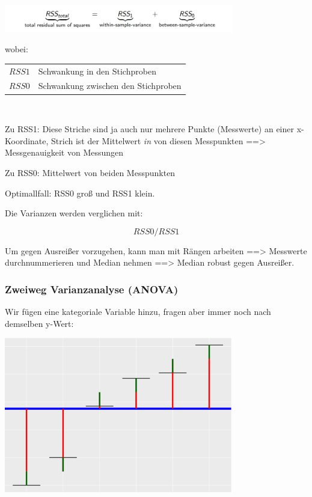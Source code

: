 \documentclass[
]{article}
\begin{document}
\includegraphics[width=10cm, center]{Fig9}

\bgroup wobei: \begin{tabular}[t]{>{$}l<{$} @{${} \quad ... \quad {}$} l}
RSS1 & Schwankung in den Stichproben \\
RSS0 & Schwankung zwischen den Stichproben
\end{tabular}\\[\belowdisplayskip]\egroup

Zu RSS1: Diese Striche sind ja auch nur mehrere Punkte (Messwerte) an
einer x-Koordinate, Strich ist der Mittelwert \emph{in} von diesen
Messpunkten ==\textgreater{} Messgenauigkeit von Messungen

Zu RSS0: Mittelwert von beiden Messpunkten

Optimallfall: RSS0 groß und RSS1 klein. \endtcolorbox

Die Varianzen werden verglichen mit:

\[ RSS0/RSS1 \]

Um gegen Ausreißer vorzugehen, kann man mit Rängen arbeiten
==\textgreater{} Messwerte durchnummerieren und Median nehmen
==\textgreater{} Median robust gegen Ausreißer.

\hypertarget{zweiweg-varianzanalyse-anova}{%
\subsubsection{Zweiweg Varianzanalyse
(ANOVA)}\label{zweiweg-varianzanalyse-anova}}

Wir fügen eine kategoriale Variable hinzu, fragen aber immer noch nach
demselben y-Wert:

\includegraphics[width=10cm, center]{Fig10}
\end{document}

